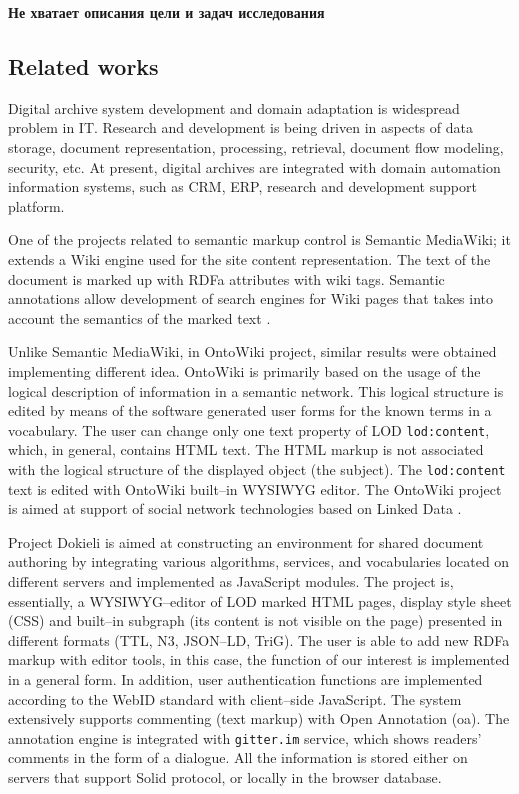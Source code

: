 \documentclass[conference,a4paper]{IEEEtran}
\begin{document}
\textbf{Не хватает описания цели и задач исследования}

\subsection{Related works}
\label{sec:relwks}

Digital archive system development and domain adaptation is wide\-spre\-ad
problem in IT.  Research and development is being driven in aspects of
data storage, document representation, processing, retrieval, document
flow modeling, security, etc.  At present, digital archives are integrated
with domain automation information systems, such as CRM, ERP, research and
development support platform.

One of the projects related to semantic markup control is Semantic MediaWiki; it extends a Wiki engine used for the site content representation.  The text of the document is marked up with RDFa attributes with wiki tags.  Semantic annotations allow development of search engines for Wiki pages that takes into account the semantics of the marked text \cite{c6}.

Unlike Semantic MediaWiki, in OntoWiki project, similar results were obtained implementing different idea.  OntoWiki is primarily based on the usage of the logical description of information in a semantic network.  This logical structure is edited by means of the software generated user forms for the known terms in a vocabulary.  The user can change only one text property of LOD \texttt{lod:content}, which, in general, contains HTML text.  The HTML markup is not associated with the logical structure of the displayed object (the subject).  The \texttt{lod:content} text is edited with OntoWiki built--in WYSIWYG editor.  The OntoWiki project is aimed at support of social network technologies based on Linked Data \cite{b6}.

Project Dokieli is aimed at constructing an environment for shared document authoring by integrating various algorithms, services, and vocabularies located on different servers \cite{b14} and implemented as JavaScript modules.  The project is, essentially, a WYSIWYG--editor of LOD marked HTML pages, display style sheet (CSS) and built--in subgraph (its content is not visible on the page) presented in different formats (TTL, N3, JSON--LD, TriG).  The user is able to add new RDFa markup with editor tools, in this case, the function of our interest is implemented in a general form.  In addition, user authentication functions are implemented according to the WebID standard with client--side JavaScript.  The system extensively supports commenting (text markup) with Open Annotation (oa).  The annotation engine is integrated with \texttt{gitter.im} service, which shows readers' comments in the form of a dialogue.  All the information is stored either on servers that support Solid protocol, or locally in the browser database.
\end{document}
